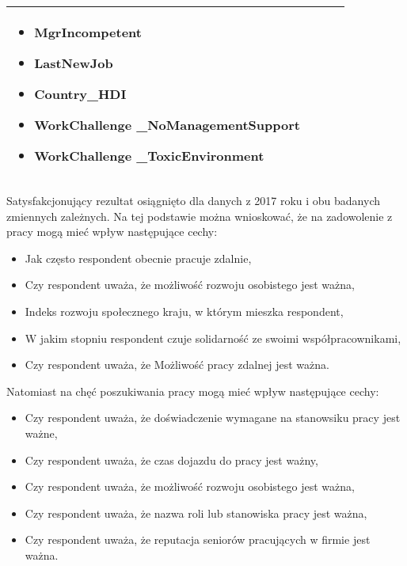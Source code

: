 \begin{minipage}{\textwidth}
\begin{table}[H]
\begin{center}
\begin{tabular}{|P{.1\textwidth}|P{.26\textwidth}|P{.26\textwidth}|P{.26\textwidth}|}
\begin{itemize}
                             \item MgrIncompetent
                             \item LastNewJob
                             \item Country\_HDI
                             \item WorkChallenge \_NoManagementSupport
                             \item WorkChallenge \_ToxicEnvironment
                         \end{itemize} \\
                         \hline
                     \end{tabular}
                 \end{center}
                 \raggedright\source{\ownwork}
                 \vspace{0.75cm}
             \end{table}
\end{minipage}

Satysfakcjonujący rezultat osiągnięto dla danych z 2017 roku i obu badanych zmiennych zależnych.
Na tej podstawie można wnioskować, że na zadowolenie z pracy mogą mieć wpływ następujące cechy:

\begin{itemize}
    \item Jak często respondent obecnie pracuje zdalnie,
    \item Czy respondent uważa, że możliwość rozwoju osobistego jest ważna,
    \item Indeks rozwoju społecznego kraju, w którym mieszka respondent,
    \item W jakim stopniu respondent czuje solidarność ze swoimi współpracownikami,
    \item Czy respondent uważa, że Możliwość pracy zdalnej jest ważna.
\end{itemize}

Natomiast na chęć poszukiwania pracy mogą mieć wpływ następujące cechy:

\begin{itemize}
    \item Czy respondent uważa, że doświadczenie wymagane na stanowsiku pracy jest ważne,
    \item Czy respondent uważa, że czas dojazdu do pracy jest ważny,
    \item Czy respondent uważa, że możliwość rozwoju osobistego jest ważna,
    \item Czy respondent uważa, że nazwa roli lub stanowiska pracy jest ważna,
    \item Czy respondent uważa, że reputacja seniorów pracujących w firmie jest ważna.
\end{itemize}


